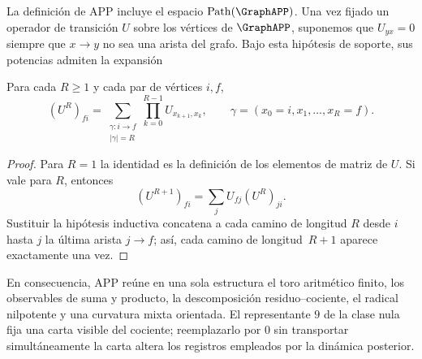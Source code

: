 La definición de APP incluye el espacio
\(\operatorname{Path}(\GraphAPP)\). Una vez fijado un operador de
transición \(U\) sobre los vértices de \(\GraphAPP\), suponemos que
\(U_{yx}=0\) siempre que \(x\to y\) no sea una arista del grafo. Bajo esta
hipótesis de soporte, sus potencias admiten la expansión
\begin{proposition}
\label{prop:app-suma-caminos}
Para cada \(R\ge1\) y cada par de vértices \(i,f\),
\[
(U^R)_{fi}
=\sum_{\substack{\gamma:i\to f\\|\gamma|=R}}
\prod_{k=0}^{R-1}U_{x_{k+1},x_k},
\qquad
\gamma=(x_0=i,x_1,\ldots,x_R=f).
\]
\end{proposition}

\begin{proof}
Para \(R=1\) la identidad es la definición de los elementos de matriz de
\(U\). Si vale para \(R\), entonces
\[
 (U^{R+1})_{fi}
 =\sum_j U_{fj}(U^R)_{ji}.
\]
Sustituir la hipótesis inductiva concatena a cada camino de longitud \(R\)
desde \(i\) hasta \(j\) la última arista \(j\to f\); así, cada camino de
longitud~\(R+1\) aparece exactamente una vez.\qedhere
\end{proof}

En consecuencia, APP reúne en una sola estructura el toro aritmético finito,
los observables de suma y producto, la descomposición residuo--cociente, el
radical nilpotente y una curvatura mixta orientada. El representante \(9\) de
la clase nula fija una carta visible del cociente; reemplazarlo por \(0\) sin
transportar simultáneamente la carta altera los registros empleados por la
dinámica posterior.
\fi
